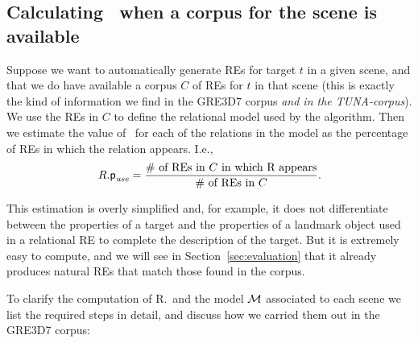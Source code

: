 \subsection{Calculating \puse\ when a corpus for the scene is available}

Suppose we want to automatically generate REs for target $t$ in a given scene, and that we do have available a corpus $C$ 
of REs for $t$ in that scene (this is exactly the kind of information we find in the GRE3D7 corpus \textit{and in the TUNA-corpus}).  
We use the REs in $C$ to define the relational model 
used by the algorithm.  Then we estimate the value of \puse\ for each of the relations in the model as the percentage of REs 
in which the relation appears.  I.e., 
\begin{equation}\label{eq1}
R.\textsf{p}_\textit{use} = \frac{\# \mbox{ of REs in $C$ in which R appears}}{\# \mbox{ of REs in $C$}}.
\end{equation}

\noindent
This estimation is overly simplified and, for example, it does not differentiate between the properties of a target and the 
properties of a landmark object used in a relational RE to complete the description of the target.  But it is extremely easy 
to compute, and we will see in Section~\ref{sec:evaluation} that it already produces natural REs that match those found in the corpus. 

To clarify the computation of R.\puse\ and the model $\mathcal{M}$ associated to each scene we list the required steps in detail, 
and discuss how we carried them out in the GRE3D7 corpus:

